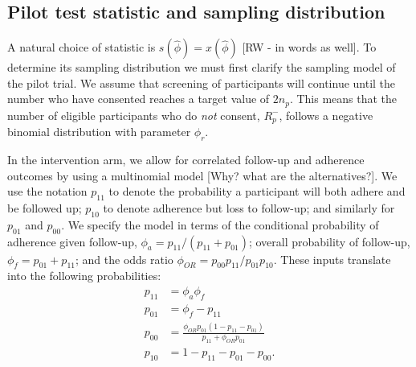 \documentclass[AMA,STIX1COL]{WileyNJD-v2}
\begin{document}


\subsection{Pilot test statistic and sampling distribution}

A natural choice of statistic is $s(\hat{\phi}) = x(\hat{\phi})$ [RW - in words as well]. To determine its sampling distribution we must first clarify the sampling model of the pilot trial. We assume that screening of participants will continue until the number who have consented reaches a target value of $2n_p$. This means that the number of eligible participants who do \emph{not} consent, $R_p^-$, follows a negative binomial distribution with parameter $\phi_r$. 

In the intervention arm, we allow for correlated follow-up and adherence outcomes by using a multinomial model [Why? what are the alternatives?]. We use the notation $p_{11}$ to denote the probability a participant will both adhere and be followed up; $p_{10}$ to denote adherence but loss to follow-up; and similarly for $p_{01}$ and $p_{00}$. We specify the model in terms of the conditional probability of adherence given follow-up, $\phi_a = p_{11}/(p_{11} + p_{01})$; overall probability of follow-up, $\phi_f = p_{01} + p_{11}$; and the odds ratio $\phi_{OR} = p_{00}p_{11}/p_{01}p_{10}$. These inputs translate into the following probabilities:
\begin{align*}
p_{11} &= \phi_a \phi_f \\
p_{01} &= \phi_f - p_11 \\
p_{00} &= \frac{\phi_{OR} p_{01}(1-p_{11}-p_{01})}{p_{11} + \phi_{OR} p_{01}} \\
p_{10} &= 1 - p_{11} - p_{01} - p_{00}.
\end{align*}

\end{document}
